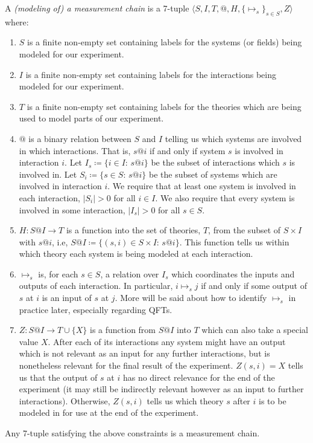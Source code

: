 \documentclass[prd,twocolumn,superscriptaddress,floatfix,amsmath,amssymb,amsfonts,nofootinbib]{revtex4-2}
\begin{document}
A \textit{(modeling of) a measurement chain} is a 7-tuple \mbox{$\langle S,I,T,@,H,\{\mapsto_s\}_{s\in S},Z\rangle$} where:
\begin{enumerate}
    \item $S$ is a finite non-empty set containing labels for the systems (or fields) being modeled for our experiment.
    \item $I$ is a finite non-empty set containing labels for the interactions being modeled for our experiment.
    \item $T$ is a finite non-empty set containing labels for the theories which are being used to model parts of our experiment.
    \item $@$ is a binary relation between $S$ and $I$ telling us which systems are involved in which interactions. That is, $s@i$ if and only if system $s$ is involved in interaction $i$. Let \mbox{$I_s\coloneqq\{i\in I:\, s@i\}$} be the subset of interactions which $s$ is involved in. Let \mbox{$S_i\coloneqq\{s\in S:\, s@i\}$} be the subset of systems which are involved in interaction $i$. We require that at least one system is involved in each interaction, \mbox{$\vert S_i\vert>0$} for all $i\in I$. We also require that every system is involved in some interaction, \mbox{$\vert I_s\vert>0$} for all $s\in S$.  
    \item $H:S@I\to T$ is a function into the set of theories, $T$, from the subset of $S\times I$ with $s@i$, i.e, \mbox{$S@I\coloneqq\{(s,i)\in S\times I:\, s@i\}$}. This function tells us within which theory each system is being modeled at each interaction.
    \item $\mapsto_s$ is, for each $s\in S$, a relation over $I_s$ which coordinates the inputs and outputs of each interaction. In particular, $i \mapsto_s j$ if and only if some output of $s$ at $i$ is an input of $s$ at $j$. More will be said about how to identify $\mapsto_s$ in practice later, especially regarding QFTs. 
    \item $Z:S@I\to T\cup\{X\}$ is a function from $S@I$ into $T$ which can also take a special value $X$. After each of its interactions any system might have an output which is not relevant as an input for any further interactions, but is nonetheless relevant for the final result of the experiment. $Z(s,i)=X$ tells us that the output of $s$ at $i$ has no direct relevance for the end of the experiment (it may still be indirectly relevant however as an input to further interactions). Otherwise, $Z(s,i)$ tells us which theory $s$ after $i$ is to be modeled in for use at the end of the experiment.
\end{enumerate}
Any 7-tuple satisfying the above constraints is a measurement chain.
\end{document}

